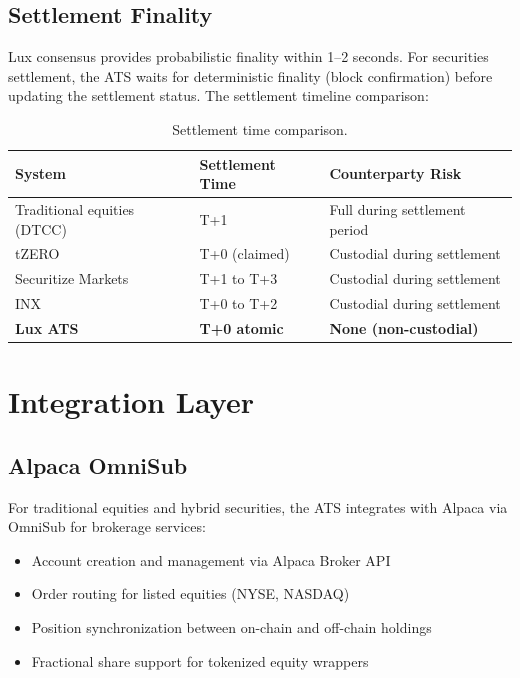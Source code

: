 \documentclass[11pt,a4paper]{article}
\begin{document}
\subsection{Settlement Finality}

Lux consensus provides probabilistic finality within 1--2 seconds. For securities settlement, the ATS waits for deterministic finality (block confirmation) before updating the settlement status. The settlement timeline comparison:

\begin{table}[H]
\centering
\caption{Settlement time comparison.}
\label{tab:settlement}
\begin{tabular}{lll}
\toprule
\textbf{System} & \textbf{Settlement Time} & \textbf{Counterparty Risk} \\
\midrule
Traditional equities (DTCC) & T+1 & Full during settlement period \\
tZERO & T+0 (claimed) & Custodial during settlement \\
Securitize Markets & T+1 to T+3 & Custodial during settlement \\
INX & T+0 to T+2 & Custodial during settlement \\
\textbf{Lux ATS} & \textbf{T+0 atomic} & \textbf{None (non-custodial)} \\
\bottomrule
\end{tabular}
\end{table}

\section{Integration Layer}\label{sec:integration}

\subsection{Alpaca OmniSub}

For traditional equities and hybrid securities, the ATS integrates with Alpaca via OmniSub for brokerage services:

\begin{itemize}[nosep]
  \item Account creation and management via Alpaca Broker API
  \item Order routing for listed equities (NYSE, NASDAQ)
  \item Position synchronization between on-chain and off-chain holdings
  \item Fractional share support for tokenized equity wrappers
\end{itemize}
\end{document}
